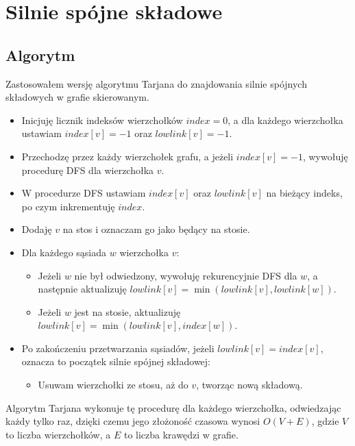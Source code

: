 \documentclass[12pt, letterpaper]{article}
\begin{document}
\clearpage

\section{Silnie spójne składowe}

\subsection{Algorytm}

Zastosowałem wersję algorytmu Tarjana do znajdowania silnie spójnych składowych
w grafie skierowanym.
\begin{itemize}
    \item Inicjuję licznik indeksów wierzchołków $index = 0$, a dla każdego
          wierzchołka ustawiam $index[v] = -1$ oraz $lowlink[v] = -1$.
    \item Przechodzę przez każdy wierzchołek grafu, a jeżeli $index[v] = -1$,
          wywołuję procedurę DFS dla wierzchołka $v$.
    \item W procedurze DFS ustawiam $index[v]$ oraz $lowlink[v]$ na bieżący
          indeks, po czym inkrementuję $index$.
    \item Dodaję $v$ na stos i oznaczam go jako będący na stosie.
    \item Dla każdego sąsiada $w$ wierzchołka $v$:
          \begin{itemize}
              \item Jeżeli $w$ nie był odwiedzony, wywołuję rekurencyjnie DFS
                    dla
                    $w$, a następnie aktualizuję $lowlink[v] = \min(lowlink[v],
                        lowlink[w])$.
              \item Jeżeli $w$ jest na stosie, aktualizuję $lowlink[v] =
                        \min(lowlink[v], index[w])$.
          \end{itemize}
    \item Po zakończeniu przetwarzania sąsiadów, jeżeli $lowlink[v] =
              index[v]$, oznacza to początek silnie spójnej składowej:
          \begin{itemize}
              \item Usuwam wierzchołki ze stosu, aż do $v$, tworząc nową
                    składową.
          \end{itemize}
\end{itemize}

Algorytm Tarjana wykonuje tę procedurę dla każdego wierzchołka, odwiedzając
każdy tylko raz, dzięki czemu jego złożoność czasowa wynosi $O(V + E)$, gdzie
$V$ to liczba wierzchołków, a $E$ to liczba krawędzi w grafie.
\end{document}
